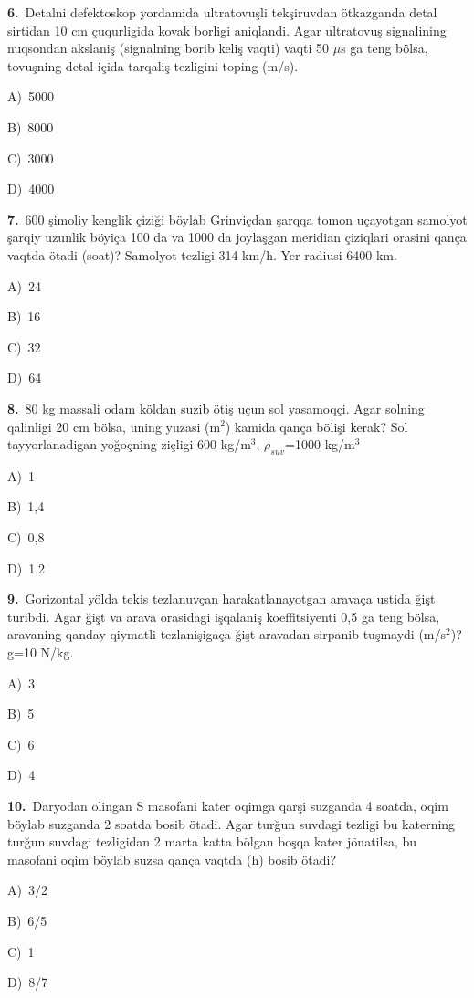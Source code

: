 \documentclass[11pt,a4paper]{article}
\newcommand{\opt}[2]{\hspace*{4mm}#1)\ #2\par}
\begin{document}
\noindent\begin{minipage}{\linewidth}
\textbf{6.}\ Detalni defektoskop yordamida ultratovuşli tekşiruvdan ötkazganda detal sirtidan 10 cm çuqurligida kovak borligi aniqlandi. Agar ultratovuş signalining nuqsondan akslaniş (signalning borib keliş vaqti) vaqti 50 $\mu$s ga teng bölsa, tovuşning detal içida tarqaliş tezligini toping (m/s).\par\smallskip
\opt{A}{5000}
\opt{B}{8000}
\opt{C}{3000}
\opt{D}{4000}
\end{minipage}\vspace{9pt}\par
\noindent\begin{minipage}{\linewidth}
\textbf{7.}\ 600 şimoliy kenglik çiziği böylab Grinviçdan şarqqa tomon uçayotgan samolyot şarqiy uzunlik böyiça 100 da va 1000 da joylaşgan meridian çiziqlari orasini qança vaqtda ötadi (soat)? Samolyot tezligi 314 km/h. Yer radiusi 6400 km.\par\smallskip
\opt{A}{24}
\opt{B}{16}
\opt{C}{32}
\opt{D}{64}
\end{minipage}\vspace{9pt}\par
\noindent\begin{minipage}{\linewidth}
\textbf{8.}\ 80 kg massali odam köldan suzib ötiş uçun sol yasamoqçi. Agar solning qalinligi 20 cm bölsa, uning yuzasi (m$^{2}$) kamida qança bölişi kerak? Sol tayyorlanadigan yoğoçning ziçligi 600 kg/m$^{3}$, $\rho_{suv}$=1000 kg/m$^{3}$\par\smallskip
\opt{A}{1}
\opt{B}{1,4}
\opt{C}{0,8}
\opt{D}{1,2}
\end{minipage}\vspace{9pt}\par
\noindent\begin{minipage}{\linewidth}
\textbf{9.}\ Gorizontal yölda tekis tezlanuvçan harakatlanayotgan aravaça ustida ğişt turibdi. Agar ğişt va arava orasidagi işqalaniş koeffitsiyenti 0,5 ga teng bölsa, aravaning qanday qiymatli tezlanişigaça ğişt aravadan sirpanib tuşmaydi (m/s$^{2}$)? g=10 N/kg.\par\smallskip
\opt{A}{3}
\opt{B}{5}
\opt{C}{6}
\opt{D}{4}
\end{minipage}\vspace{9pt}\par
\noindent\begin{minipage}{\linewidth}
\textbf{10.}\ Daryodan olingan S masofani kater oqimga qarşi suzganda 4 soatda, oqim böylab suzganda 2 soatda bosib ötadi. Agar turğun suvdagi tezligi bu katerning turğun suvdagi tezligidan 2 marta katta bölgan boşqa kater jönatilsa, bu masofani oqim böylab suzsa qança vaqtda (h) bosib ötadi?\par\smallskip
\opt{A}{3/2}
\opt{B}{6/5}
\opt{C}{1}
\opt{D}{8/7}
\end{minipage}\vspace{9pt}\par
\end{document}
